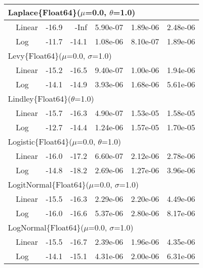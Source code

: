 \begin{tabular}{|llrrrrr|}
\hline
\multicolumn{7}{|l|}{Laplace\{Float64\}($\mu$=0.0, $\theta$=1.0)}\\ \hline
& Linear & {\color{blue}-16.9} & {\color{blue}-Inf} & {\color{blue}5.90e-07} & 1.89e-06 & 2.48e-06\\
& Log & -11.7 & -14.1 & 1.08e-06 & {\color{blue}8.10e-07} & {\color{blue}1.89e-06}\\
\hline
\multicolumn{7}{|l|}{Levy\{Float64\}($\mu$=0.0, $\sigma$=1.0)}\\ \hline
& Linear & {\color{blue}-15.2} & {\color{blue}-16.5} & {\color{blue}9.40e-07} & {\color{blue}1.00e-06} & {\color{blue}1.94e-06}\\
& Log & -14.1 & -14.9 & 3.93e-06 & 1.68e-06 & 5.61e-06\\
\hline
\multicolumn{7}{|l|}{Lindley\{Float64\}($\theta$=1.0)}\\ \hline
& Linear & {\color{blue}-15.7} & {\color{blue}-16.3} & {\color{blue}4.90e-07} & {\color{blue}1.53e-05} & {\color{blue}1.58e-05}\\
& Log & -12.7 & -14.4 & 1.24e-06 & 1.57e-05 & 1.70e-05\\
\hline
\multicolumn{7}{|l|}{Logistic\{Float64\}($\mu$=0.0, $\theta$=1.0)}\\ \hline
& Linear & {\color{blue}-16.0} & -17.2 & {\color{blue}6.60e-07} & 2.12e-06 & {\color{blue}2.78e-06}\\
& Log & -14.8 & {\color{blue}-18.2} & 2.69e-06 & {\color{blue}1.27e-06} & 3.96e-06\\
\hline
\multicolumn{7}{|l|}{LogitNormal\{Float64\}($\mu$=0.0, $\sigma$=1.0)}\\ \hline
& Linear & -15.5 & -16.3 & {\color{blue}2.29e-06} & {\color{blue}2.20e-06} & {\color{blue}4.49e-06}\\
& Log & {\color{blue}-16.0} & {\color{blue}-16.6} & 5.37e-06 & 2.80e-06 & 8.17e-06\\
\hline
\multicolumn{7}{|l|}{LogNormal\{Float64\}($\mu$=0.0, $\sigma$=1.0)}\\ \hline
& Linear & {\color{blue}-15.5} & {\color{blue}-16.7} & {\color{blue}2.39e-06} & {\color{blue}1.96e-06} & {\color{blue}4.35e-06}\\
& Log & -14.1 & -15.1 & 4.31e-06 & 2.00e-06 & 6.31e-06\\
\hline
\end{tabular}